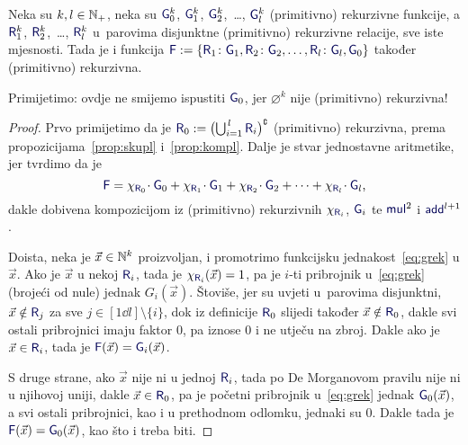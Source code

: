 \begin{teorem}\label{tm:grek}
Neka su $k,l\in{\mathbb N}_+$, neka su $\f G_0^k$, $\f G_1^k$, $\f G_2^k$,~\ldots, $\f G_l^k$ (primitivno) rekurzivne funkcije, a $\f R_1^k$, $\f R_2^k$,~\ldots, $\f R_l^k$ u~parovima disjunktne (primitivno) rekurzivne relacije, sve iste mjesnosti. Tada je i funkcija $\f F:=\{\f R_1\colon\f G_1,\f R_2\colon\f G_2,\dotsc,\f R_l\colon\f G_l,\f G_0\}$ također (primitivno) rekurzivna.
\end{teorem}

Primijetimo: ovdje ne smijemo ispustiti $\f G_0$, jer $\varnothing^k$ nije (primitivno) rekurzivna!

\begin{proof}
Prvo primijetimo da je $\f R_0:=\bigl(\bigcup\nolimits_{i=1}^{\,l}\f R_i\bigr)\kompl$ (primitivno) rekurzivna, prema propozicijama~\ref{prop:skupl} i~\ref{prop:kompl}. Dalje je stvar jednostavne aritmetike, jer tvrdimo da je
\begin{equation}\label{eq:grek}
    \f F=\chi_{\f R_0}\!\cdot \f G_0+\chi_{\f R_1}\!\cdot \f G_1+\chi_{\f R_2}\!\cdot \f G_2+\dotsb+\chi_{\f R_l}\!\cdot\f G_l\text,
\end{equation}
dakle dobivena kompozicijom iz (primitivno) rekurzivnih $\chi_{\f R_i}$, $\f G_i$ te $\f{mul}^2$ i $\f{add}^{l+1}$.

    Doista, neka je $\vec x\in{\mathbb N}^k$ proizvoljan, i promotrimo funkcijsku jednakost~\eqref{eq:grek} u $\vec x$. Ako je $\vec x$ u nekoj $\f R_i$, tada je $\chi_{\f R_i}(\vec x)=1$, pa je $i$-ti pribrojnik u~\eqref{eq:grek} (brojeći od nule) jednak $G_i(\vec x)$. Štoviše, jer su uvjeti u~parovima disjunktni, $\vec x\notin\f R_j$ za sve $j\in[1\dd l]\setminus\{i\}$, dok iz definicije $\f R_0$ slijedi također $\vec x\notin\f R_0$, dakle svi ostali pribrojnici imaju faktor $0$, pa iznose $0$ i ne utječu na zbroj. Dakle ako je $\vec x\in\f R_i$, tada je $\f F(\vec x)=\f G_i(\vec x)$.

S druge strane, ako $\vec x$ nije ni u jednoj $\f R_i$, tada po De Morganovom pravilu nije ni u njihovoj uniji, dakle $\vec x\in\f R_0$, pa je početni pribrojnik u~\eqref{eq:grek} jednak $\f G_0(\vec x)$, a svi ostali pribrojnici, kao i u prethodnom odlomku, jednaki su $0$. Dakle tada je $\f F(\vec x)=\f G_0(\vec x)$, kao što i treba biti.
\end{proof}

